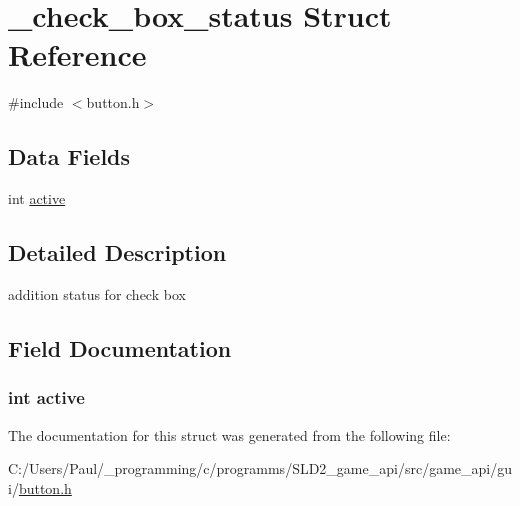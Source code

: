 \hypertarget{struct__check__box__status}{\section{\+\_\+check\+\_\+box\+\_\+status Struct Reference}
\label{struct__check__box__status}
}


{\ttfamily \#include $<$button.\+h$>$}

\subsection*{Data Fields}
\begin{DoxyCompactItemize}
\item 
int \hyperlink{struct__check__box__status_aa5805c5e936174e5092bf7a5b78e7e64}{active}
\end{DoxyCompactItemize}


\subsection{Detailed Description}
addition status for check box 

\subsection{Field Documentation}
\hypertarget{struct__check__box__status_aa5805c5e936174e5092bf7a5b78e7e64}{
\subsubsection[{active}]{\setlength{\rightskip}{0pt plus 5cm}int active}}\label{struct__check__box__status_aa5805c5e936174e5092bf7a5b78e7e64}


The documentation for this struct was generated from the following file\+:\begin{DoxyCompactItemize}
\item 
C\+:/\+Users/\+Paul/\+\_\+programming/c/programms/\+S\+L\+D2\+\_\+game\+\_\+api/src/game\+\_\+api/gui/\hyperlink{button_8h}{button.\+h}\end{DoxyCompactItemize}
